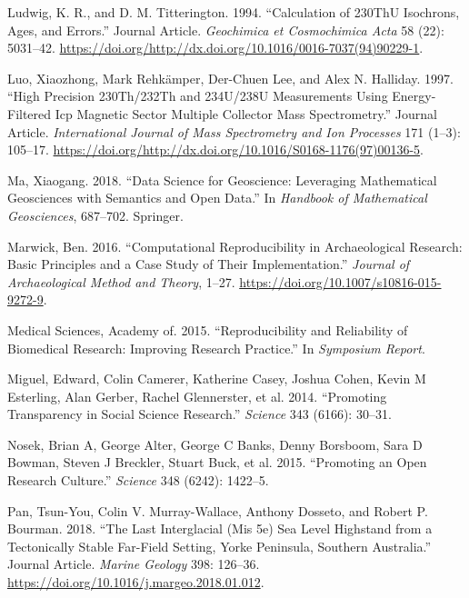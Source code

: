 \documentclass[]{elsarticle} %
\newlength{\cslhangindent}
\newenvironment{cslreferences}%
  {\setlength{\parindent}{0pt}%
  \everypar{\setlength{\hangindent}{\cslhangindent}}\ignorespaces}%
  {\par}
\begin{document}
\begin{cslreferences}
\leavevmode\hypertarget{ref-RN2155}{}%
Ludwig, K. R., and D. M. Titterington. 1994. ``Calculation of 230ThU Isochrons, Ages, and Errors.'' Journal Article. \emph{Geochimica et Cosmochimica Acta} 58 (22): 5031--42. \url{https://doi.org/http://dx.doi.org/10.1016/0016-7037(94)90229-1}.

\leavevmode\hypertarget{ref-RN2951}{}%
Luo, Xiaozhong, Mark Rehkämper, Der-Chuen Lee, and Alex N. Halliday. 1997. ``High Precision 230Th/232Th and 234U/238U Measurements Using Energy-Filtered Icp Magnetic Sector Multiple Collector Mass Spectrometry.'' Journal Article. \emph{International Journal of Mass Spectrometry and Ion Processes} 171 (1--3): 105--17. \url{https://doi.org/http://dx.doi.org/10.1016/S0168-1176(97)00136-5}.

\leavevmode\hypertarget{ref-ma2018data}{}%
Ma, Xiaogang. 2018. ``Data Science for Geoscience: Leveraging Mathematical Geosciences with Semantics and Open Data.'' In \emph{Handbook of Mathematical Geosciences}, 687--702. Springer.

\leavevmode\hypertarget{ref-Marwick2016repro}{}%
Marwick, Ben. 2016. ``Computational Reproducibility in Archaeological Research: Basic Principles and a Case Study of Their Implementation.'' \emph{Journal of Archaeological Method and Theory}, 1--27. \url{https://doi.org/10.1007/s10816-015-9272-9}.

\leavevmode\hypertarget{ref-academy2015reproducibility}{}%
Medical Sciences, Academy of. 2015. ``Reproducibility and Reliability of Biomedical Research: Improving Research Practice.'' In \emph{Symposium Report}.

\leavevmode\hypertarget{ref-miguel2014promoting}{}%
Miguel, Edward, Colin Camerer, Katherine Casey, Joshua Cohen, Kevin M Esterling, Alan Gerber, Rachel Glennerster, et al. 2014. ``Promoting Transparency in Social Science Research.'' \emph{Science} 343 (6166): 30--31.

\leavevmode\hypertarget{ref-nosek2015promoting}{}%
Nosek, Brian A, George Alter, George C Banks, Denny Borsboom, Sara D Bowman, Steven J Breckler, Stuart Buck, et al. 2015. ``Promoting an Open Research Culture.'' \emph{Science} 348 (6242): 1422--5.

\leavevmode\hypertarget{ref-RN5108}{}%
Pan, Tsun-You, Colin V. Murray-Wallace, Anthony Dosseto, and Robert P. Bourman. 2018. ``The Last Interglacial (Mis 5e) Sea Level Highstand from a Tectonically Stable Far-Field Setting, Yorke Peninsula, Southern Australia.'' Journal Article. \emph{Marine Geology} 398: 126--36. \url{https://doi.org/10.1016/j.margeo.2018.01.012}.


\end{cslreferences}
\end{document}
